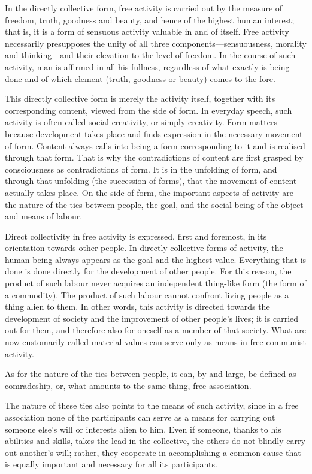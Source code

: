 \documentclass[../main]{subfiles}
\begin{document}
In the directly collective form, free activity is carried out by the measure of freedom, truth, goodness and beauty, and hence of the highest human interest; that is, it is a form of sensuous activity valuable in and of itself. Free activity necessarily presupposes the unity of all three components—sensuousness, morality and thinking—and their elevation to the level of freedom. In the course of such activity, man is affirmed in all his fullness, regardless of what exactly is being done and of which element (truth, goodness or beauty) comes to the fore.

This directly collective form is merely the activity itself, together with its corresponding content, viewed from the side of form. In everyday speech, such activity is often called social creativity, or simply creativity. Form matters because development takes place and finds expression in the necessary movement of form. Content always calls into being a form corresponding to it and is realised through that form. That is why the contradictions of content are first grasped by consciousness as contradictions of form. It is in the unfolding of form, and through that unfolding (the succession of forms), that the movement of content actually takes place. On the side of form, the important aspects of activity are the nature of the ties between people, the goal, and the social being of the object and means of labour.

Direct collectivity in free activity is expressed, first and foremost, in its orientation towards other people. In directly collective forms of activity, the human being always appears as the goal and the highest value. Everything that is done is done directly for the development of other people. For this reason, the product of such labour never acquires an independent thing-like form (the form of a commodity). The product of such labour cannot confront living people as a thing alien to them. In other words, this activity is directed towards the development of society and the improvement of other people’s lives; it is carried out for them, and therefore also for oneself as a member of that society. What are now customarily called material values can serve only as means in free communist activity.

As for the nature of the ties between people, it can, by and large, be defined as comradeship, or, what amounts to the same thing, free association.

The nature of these ties also points to the means of such activity, since in a free association none of the participants can serve as a means for carrying out someone else’s will or interests alien to him. Even if someone, thanks to his abilities and skills, takes the lead in the collective, the others do not blindly carry out another’s will; rather, they cooperate in accomplishing a common cause that is equally important and necessary for all its participants.
\end{document}
